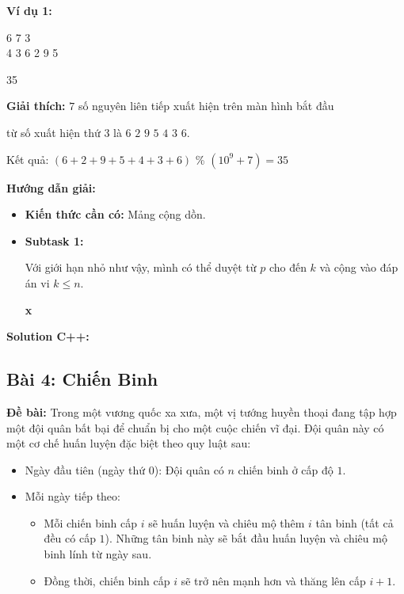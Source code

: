 \documentclass[12pt]{scrartcl}  %
\begin{document}
\textbf{Ví dụ 1:}
\begin{tcolorbox}[colback=gray!5!white, colframe=blue!50!black, title=Input]
6 7 3\\
4 3 6 2 9 5
\end{tcolorbox}
\begin{tcolorbox}[colback=gray!5!white, colframe=green!50!black, title=Output]
35
\end{tcolorbox}

\textbf{Giải thích:}
$7$ số nguyên liên tiếp xuất hiện trên màn hình bắt đầu

từ số xuất hiện thứ $3$ là $6$ $2$ $9$ $5$ $4$ $3$ $6$.

Kết quả: $(6 + 2 + 9 + 5 + 4 + 3 + 6)$ \% $(10^9 + 7) = 35$

\textbf{Hướng dẫn giải:}

\begin{itemize}
    \item \textbf{Kiến thức cần có:} Mảng cộng dồn.
    \item \textbf{Subtask 1:}
    
    Với giới hạn nhỏ như vậy, mình có thể duyệt từ $p$ cho đến $k$ và cộng vào
    đáp án vi $k \leq n$.
    
    \textbf{x}
\end{itemize}

\textbf{Solution C++:}

\subsection{Bài 4: Chiến Binh}

\textbf{Đề bài:}
Trong một vương quốc xa xưa, một vị tướng huyền thoại đang tập hợp một đội quân bất bại để chuẩn
bị cho một cuộc chiến vĩ đại. Đội quân này có một cơ chế huấn luyện đặc biệt theo quy luật sau:
\begin{itemize}
    \item Ngày đầu tiên (ngày thứ $0$): Đội quân có $n$ chiến binh ở cấp độ $1$.
    \item Mỗi ngày tiếp theo: 
    \begin{itemize}
        \item Mỗi chiến binh cấp $i$ sẽ huấn luyện và chiêu mộ thêm $i$ tân binh (tất cả đều có cấp $1$).
Những tân binh này sẽ bắt đầu huấn luyện và chiêu mộ binh lính từ ngày sau.
        \item Đồng thời, chiến binh cấp $i$ sẽ trở nên mạnh hơn và thăng lên cấp $i + 1$.
    \end{itemize}
\end{itemize}
\end{document}
